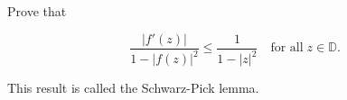 Prove that

$$
\frac{|f'(z)|}{1 - |f(z)|^2} \le \frac{1}{1 - |z|^2} \quad \text{for all} \; z \in \mathbb{D}.
$$

This result is called the Schwarz-Pick lemma.